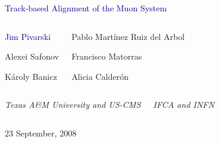 \documentclass[compress]{beamer}
\begin{document}
\begin{frame}
\vfill
\begin{center}
\textcolor{darkblue}{\Large Track-based Alignment of the Muon System}

\vfill
\begin{columns}
\begin{center}
\large
\textcolor{darkblue}{Jim Pivarski}

\vspace{0.2 cm}
Alexei Safonov

\vspace{0.2 cm}
K\'aroly Banicz
\end{center}

\begin{center}
\large
Pablo Mart\'inez Ruiz del Arbol

\vspace{0.2 cm}
Francisco Matorras

\vspace{0.2 cm}
Alicia Calder\'on
\vspace{0.2 cm}

\end{center}
\end{columns}

\begin{columns}
\begin{center}
\scriptsize
{\it Texas A\&M University and US-CMS}
\end{center}
\begin{center}
\scriptsize
{\it IFCA and INFN}
\end{center}
\end{columns}

\vfill
23 September, 2008

\end{center}
\end{frame}

\end{document}
